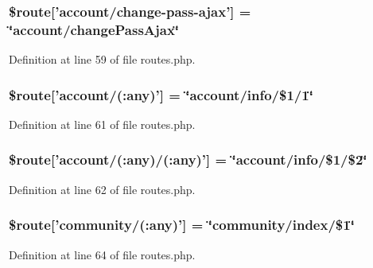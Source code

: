 \hypertarget{routes_8php_aa49f89cc8416c60f78cb2e222776c46b}{
\subsubsection[{\$route}]{\setlength{\rightskip}{0pt plus 5cm}\$route\mbox{[}'account/change-\/pass-\/ajax'\mbox{]} = \char`\"{}account/change\-Pass\-Ajax\char`\"{}}}\label{routes_8php_aa49f89cc8416c60f78cb2e222776c46b}


Definition at line 59 of file routes.\-php.

\hypertarget{routes_8php_ab69c72ae7bdfb0b07485edc5eab66e93}{
\subsubsection[{\$route}]{\setlength{\rightskip}{0pt plus 5cm}\$route\mbox{[}'account/(\-:any)'\mbox{]} = \char`\"{}account/info/\$1/1\char`\"{}}}\label{routes_8php_ab69c72ae7bdfb0b07485edc5eab66e93}


Definition at line 61 of file routes.\-php.

\hypertarget{routes_8php_ae072c3bc3476a31e3cc7a4a928bccc8c}{
\subsubsection[{\$route}]{\setlength{\rightskip}{0pt plus 5cm}\$route\mbox{[}'account/(\-:any)/(\-:any)'\mbox{]} = \char`\"{}account/info/\$1/\$2\char`\"{}}}\label{routes_8php_ae072c3bc3476a31e3cc7a4a928bccc8c}


Definition at line 62 of file routes.\-php.

\hypertarget{routes_8php_aa42a2acd00cabe0c949ace0144b32d17}{
\subsubsection[{\$route}]{\setlength{\rightskip}{0pt plus 5cm}\$route\mbox{[}'community/(\-:any)'\mbox{]} = \char`\"{}community/index/\$1\char`\"{}}}\label{routes_8php_aa42a2acd00cabe0c949ace0144b32d17}


Definition at line 64 of file routes.\-php.

